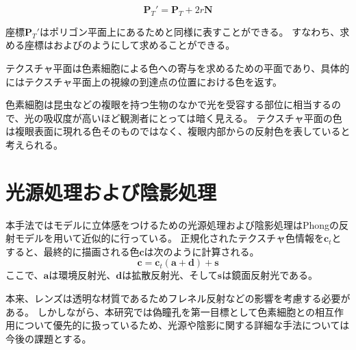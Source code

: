 \begin{equation}
\label{EPtdash}
\bm{P}_T' = \bm{P}_T + 2r\bm{N}
\end{equation}

\noindent
座標$\bm{P}_T'$はポリゴン平面上にあるためと同様に表すことができる。
すなわち、求める座標はおよびのようにして求めることができる。


テクスチャ平面は色素細胞による色への寄与を求めるための平面であり、具体的にはテクスチャ平面上の視線の到達点の位置における色を返す。

色素細胞は昆虫などの複眼を持つ生物のなかで光を受容する部位に相当するので、光の吸収度が高いほど観測者にとっては暗く見える。
テクスチャ平面の色は複眼表面に現れる色そのものではなく、複眼内部からの反射色を表していると考えられる。



\section{光源処理および陰影処理}
\label{SPhongandshade}

本手法ではモデルに立体感をつけるための光源処理および陰影処理はPhongの反射モデルを用いて近似的に行っている。
正規化されたテクスチャ色情報を$\bm{c}_t$とすると、最終的に描画される色$\bm{c}$は次のように計算される。
\begin{equation}
\label{EColor}
\bm{c} = \bm{c}_t(\bm{a} + \bm{d}) + \bm{s}
\end{equation}
ここで、$\bm{a}$は環境反射光、$\bm{d}$は拡散反射光、そして$\bm{s}$は鏡面反射光である。

本来、レンズは透明な材質であるためフレネル反射などの影響を考慮する必要がある。
しかしながら、本研究では偽瞳孔を第一目標として色素細胞との相互作用について優先的に扱っているため、光源や陰影に関する詳細な手法については今後の課題とする。

